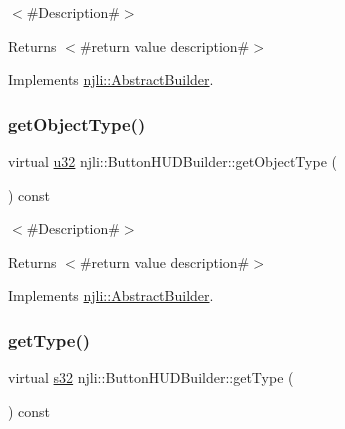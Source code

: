 $<$\#\+Description\#$>$

\begin{DoxyReturn}{Returns}
$<$\#return value description\#$>$ 
\end{DoxyReturn}


Implements \mbox{\hyperlink{classnjli_1_1_abstract_builder_a902f73ea78031b06aca183a417f3413b}{njli\+::\+Abstract\+Builder}}.

\mbox{\label{classnjli_1_1_button_h_u_d_builder_aab151f1c413960cb7947976d405d6397}} 
\subsubsection{\texorpdfstring{get\+Object\+Type()}{getObjectType()}}
{\footnotesize\ttfamily virtual \mbox{\hyperlink{_util_8h_a10e94b422ef0c20dcdec20d31a1f5049}{u32}} njli\+::\+Button\+H\+U\+D\+Builder\+::get\+Object\+Type (\begin{DoxyParamCaption}{ }\end{DoxyParamCaption}) const\hspace{0.3cm}{\ttfamily [virtual]}}

$<$\#\+Description\#$>$

\begin{DoxyReturn}{Returns}
$<$\#return value description\#$>$ 
\end{DoxyReturn}


Implements \mbox{\hyperlink{classnjli_1_1_abstract_builder_a0f2d344fcf697b167f4f2b1122b5fb33}{njli\+::\+Abstract\+Builder}}.

\mbox{\label{classnjli_1_1_button_h_u_d_builder_af3e9aa36492c2e5f260ae274c3e5e902}} 
\subsubsection{\texorpdfstring{get\+Type()}{getType()}}
{\footnotesize\ttfamily virtual \mbox{\hyperlink{_util_8h_aa62c75d314a0d1f37f79c4b73b2292e2}{s32}} njli\+::\+Button\+H\+U\+D\+Builder\+::get\+Type (\begin{DoxyParamCaption}{ }\end{DoxyParamCaption}) const\hspace{0.3cm}{\ttfamily [virtual]}}

